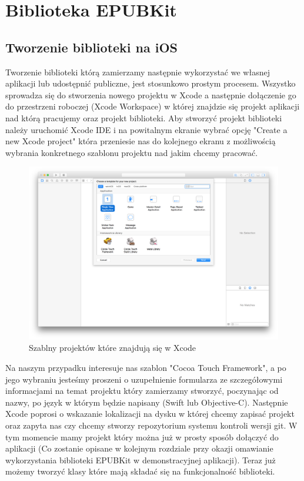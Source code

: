 \chapter{Biblioteka EPUBKit}
\section{Tworzenie biblioteki na iOS}

Tworzenie biblioteki którą zamierzamy następnie wykorzystać we własnej aplikacji lub udostępnić publiczne, jest stosunkowo prostym procesem. Wszystko sprowadza się do stworzenia nowego projektu w Xcode a następnie dołączenie go do przestrzeni roboczej (Xcode Workspace) w której znajdzie się projekt aplikacji nad którą pracujemy oraz projekt biblioteki. Aby stworzyć projekt biblioteki należy uruchomić Xcode IDE i na powitalnym ekranie wybrać opcję "Create a new Xcode project" która przeniesie nas do kolejnego ekranu z możliwością wybrania konkretnego szablonu projektu nad jakim chcemy pracować.

\begin{figure}[ht!]
  \centering
  \includegraphics[width=120mm]{images/chapter-4-image-1-new-project.png}
  \caption{Szablny projektów które znajdują się w Xcode}
  \label{chapter-4-image-1-new-project}
\end{figure}

Na naszym przypadku interesuje nas szablon "Cocoa Touch Framework", a po jego wybraniu jesteśmy proszeni o uzupełnienie formularza ze szczegółowymi informacjami na temat projektu który zamierzamy stworzyć, poczynając od nazwy, po język w którym będzie napisany (Swift lub Objective-C). Następnie Xcode poprosi o wskazanie lokalizacji na dysku w której chcemy zapisać projekt oraz zapyta nas czy chcemy stworzy repozytorium systemu kontroli wersji git. W tym momencie mamy projekt który można już w prosty sposób dołączyć do aplikacji (Co zostanie opisane w kolejnym rozdziale przy okazji omawianie wykorzystania biblioteki EPUBKit w demonstracyjnej aplikacji). Teraz już możemy tworzyć klasy które mają składać się na funkcjonalność biblioteki.

